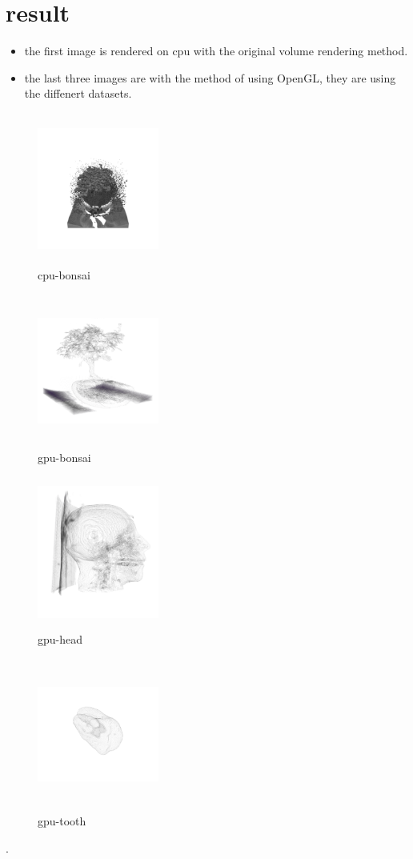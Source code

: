 \documentclass[acmtog]{acmart}
\begin{document}
\section{result}
\begin{itemize}
	\item the first image is rendered on cpu with the original volume rendering method.\\
	\item the last three images are with the method of using OpenGL, they are using the diffenert datasets.\\
\end{itemize}


\begin{figure}[h]
	\centering
	\includegraphics[width=4cm,height=5cm]{result_cpu}
	\caption{cpu-bonsai}
\end{figure}

\begin{figure}[h]
	\centering
	\includegraphics[width=4cm,height=5cm]{gpu_bonsai}
	\caption{gpu-bonsai}
\end{figure}

\begin{figure}[h]
	\centering
	\includegraphics[width=4cm,height=5cm]{gpu_head}
	\caption{gpu-head}
\end{figure}

\begin{figure}[h]
	\centering
	\includegraphics[width=4cm,height=5cm]{gpu_tooth}
	\caption{gpu-tooth}
\end{figure}
.
\\
\end{document}
